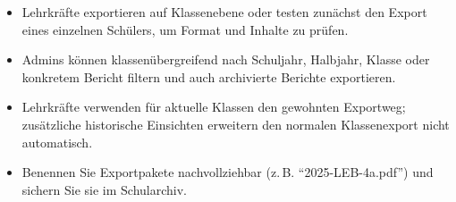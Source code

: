 \documentclass[12pt,a4paper]{article}
\begin{document}
\begin{itemize}
  \item Lehrkräfte exportieren auf Klassenebene oder testen zunächst den Export eines einzelnen Schülers, um Format und Inhalte zu prüfen.
  \item Admins können klassenübergreifend nach Schuljahr, Halbjahr, Klasse oder konkretem Bericht filtern und auch archivierte Berichte exportieren.
  \item Lehrkräfte verwenden für aktuelle Klassen den gewohnten Exportweg; zusätzliche historische Einsichten erweitern den normalen Klassenexport nicht automatisch.
  \item Benennen Sie Exportpakete nachvollziehbar (z.\,B. \enquote{2025-LEB-4a.pdf}) und sichern Sie sie im Schularchiv.
\end{itemize}
\end{document}
